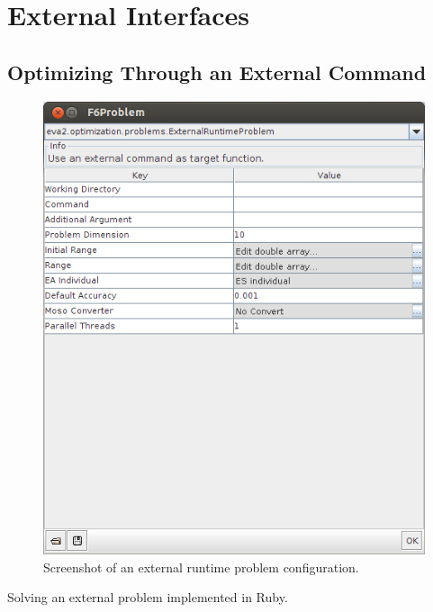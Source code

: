 \chapter{External Interfaces\label{sec:External-Interfaces}}

\section{Optimizing Through an External Command\label{sub:Optimizing-external-cmd}}

\begin{figure}
\noindent \begin{centering}
\includegraphics[width=0.4\columnwidth]{pics/screenshot-ExtRun}
\par\end{centering}
\caption{Screenshot of an external runtime problem configuration.\label{fig:Screenshot-external-runtime}}
\end{figure}

\begin{algorithm}
	
	
	\caption{Solving an external problem implemented in Ruby.\label{alg:externalProblem}}
\end{algorithm}


